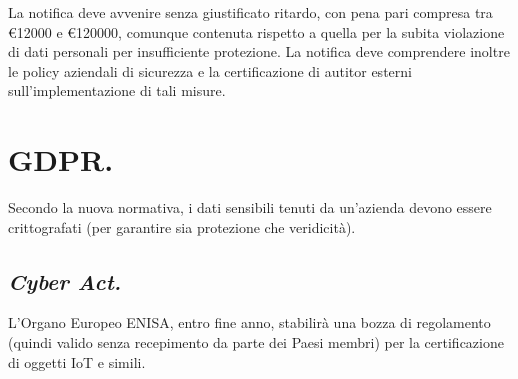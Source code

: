 \documentclass[a4page, 11pt, twocolumn]{article}
\begin{document}
La notifica deve avvenire senza giustificato ritardo, con pena pari compresa tra \euro{12000} e \euro{120000}, comunque contenuta rispetto a quella per la subita violazione di dati personali per insufficiente protezione.
La notifica deve comprendere inoltre le policy aziendali di sicurezza e la certificazione di autitor esterni sull'implementazione di tali misure.

\section{GDPR.}
Secondo la nuova normativa, i dati sensibili tenuti da un'azienda devono essere crittografati (per garantire sia protezione che veridicità).

\subsection{\textit{Cyber Act.}}
L'Organo Europeo ENISA, entro fine anno, stabilirà una bozza di regolamento (quindi valido senza recepimento da parte dei Paesi membri) per la certificazione di oggetti IoT e simili.
\end{document}
